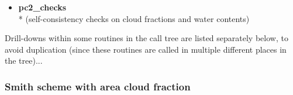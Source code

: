 \begin{itemize}
\begin{itemize}
\begin{tcolorbox}
\begin{itemize}
      \begin{itemize}

      \item \textcolor{mygreen}{\bf pc2\_checks} \\*
      (self-consistency checks on cloud fractions and water contents)

      \end{itemize}

    \end{itemize}
  \end{tcolorbox}

  \end{itemize}

\end{itemize}


Drill-downs within some routines in the call tree are listed separately below,
to avoid duplication
(since these routines are called in multiple different places in the tree)...

\subsubsection{Smith scheme with area cloud fraction}
\label{subsubsec:smith_acf}

